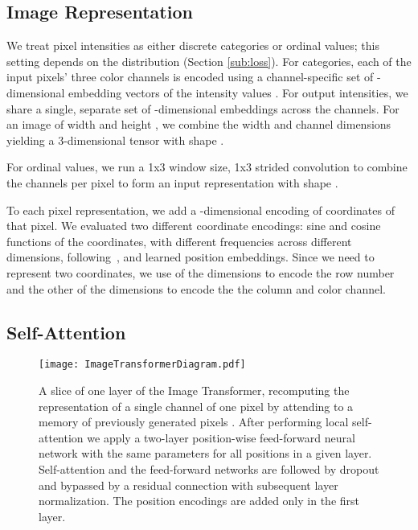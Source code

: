\documentclass{article}
\DeclareRobustCommand{\sidenote}[1]{\marginpar{
                                    \RaggedRight
                                    \textcolor{red}{\textsf{#1}}}}
\begin{document}
\subsection{Image Representation}\label{sec:image-rep}
We treat pixel intensities as either discrete categories or ordinal values; this setting depends on the distribution (Section \ref{sub:loss}).
For categories, each of the input pixels' three color channels is encoded using a channel-specific set of  -dimensional embedding vectors of the intensity values . For output intensities, we share a single, separate set of  -dimensional embeddings across the channels.
For an image of width  and height , we combine the width and channel dimensions yielding a 3-dimensional tensor with shape .

For ordinal values, we run a 1x3 window size, 1x3 strided convolution to combine the  channels per pixel to form an input representation with shape .

To each pixel representation, we add a -dimensional encoding of coordinates of that pixel. We evaluated two different coordinate encodings: sine and cosine functions of the coordinates, with different frequencies across different dimensions, following~\cite{aiayn}, and learned position embeddings. Since we need to represent two coordinates, we use  of the dimensions to encode the row number and the other  of the dimensions to encode the the column and color channel.

\iffalse

as follows:

\sidenote{trandustin: change to learnable embeddings?}


where  and  are the position and dimension respectively. Each dimension of the positional encoding corresponds to a sinusoid and the wavelengths form a geometric progression from  to .  
\fi





\subsection{Self-Attention}

\begin{figure}
  \centering
  \texttt{[image: ImageTransformerDiagram.pdf]}
  \caption{A slice of one layer of the Image Transformer, recomputing the representation  of a single channel of one pixel  by attending to a memory of previously generated pixels . After performing local self-attention we apply a two-layer position-wise feed-forward neural network with the same parameters for all positions in a given layer. Self-attention and the feed-forward networks are followed by dropout and bypassed by a residual connection with subsequent layer normalization. The position encodings  are added only in the first layer.}
  \label{fig:model-arch}
\end{figure}
\end{document}
